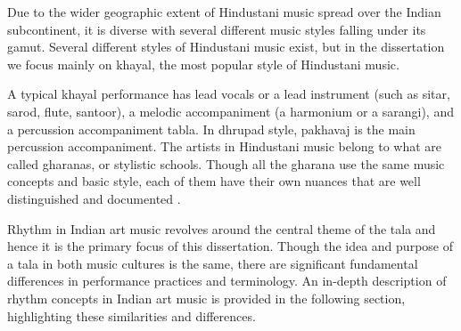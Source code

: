 Due to the wider geographic extent of Hindustani music spread over the Indian subcontinent, it is diverse with several different music styles falling under its gamut. Several different styles of Hindustani music exist, but in the dissertation we focus mainly on \gls{khayal}, the most popular style of Hindustani music. 

A typical \gls{khayal} performance has lead vocals or a lead instrument (such as \gls{sitar}, \gls{sarod}, flute, \gls{santoor}), a melodic accompaniment (a harmonium or a \gls{sarangi}), and a percussion accompaniment \gls{tabla}. In \gls{dhrupad} style, \gls{pakhavaj} is the main percussion accompaniment. The artists in Hindustani music belong to what are called \glspl{gharana}, or stylistic schools. Though all the \gls{gharana} use the same music concepts and basic style, each of them have their own nuances that are well distinguished and documented \cite{mehta:08:gharana}. 

Rhythm in Indian art music revolves around the central theme of the \gls{tala} and hence it is the primary focus of this dissertation. Though the idea and purpose of a \gls{tala} in both music cultures is the same, there are significant fundamental differences in performance practices and terminology. An in-depth description of rhythm concepts in Indian art music is provided in the following section, highlighting these similarities and differences.
